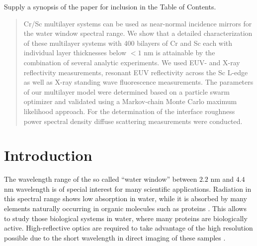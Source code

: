\documentclass{iucr}              %
\begin{document}
\maketitle                        %

\begin{synopsis}
Supply a synopsis of the paper for inclusion in the Table of Contents.
\end{synopsis}

\begin{abstract}
Cr/Sc multilayer systems can be used as near-normal incidence mirrors for the water window spectral range. We show that a detailed characterization of these multilayer systems  with 400 bilayers of Cr and Sc each with individual layer thicknesses below $<1$ nm is attainable by the combination of several analytic experiments. We used EUV- and X-ray reflectivity measurements, resonant EUV reflectivity across the Sc L-edge as well as X-ray standing wave fluorescence measurements. The parameters of our multilayer model were determined based on a particle swarm optimizer and validated using a Markov-chain Monte Carlo maximum likelihood approach. For the determination of the interface roughness power spectral density diffuse scattering measurements were conducted.
\end{abstract}



\section{Introduction}

The wavelength range of the so called ``water window'' between $2.2$ nm and $4.4$ nm wavelength is of special interest for many scientific applications. Radiation in this spectral range shows low absorption in water, while it is absorbed by many elements naturally occurring in organic molecules such as proteins \cite{WaterWindowBioRelevance}. This allows to study those biological systems in water, where many proteins are biologically active. High-reflective optics are required to take advantage of the high resolution possible due to the short wavelength in direct imaging of these samples \cite{waterwindow_mirrors_1,Legall:12}.
\end{document}
